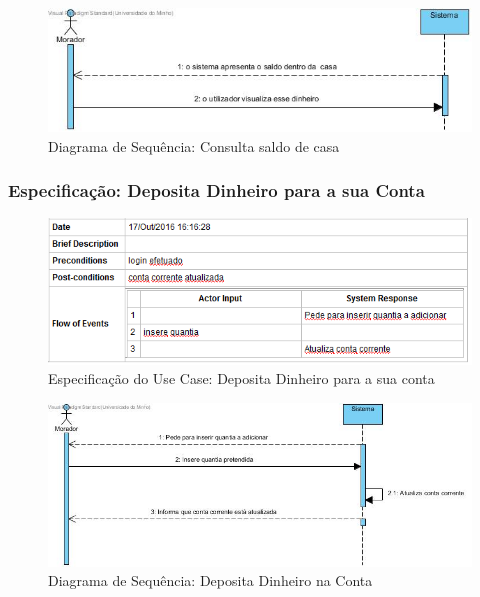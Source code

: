 \begin{figure}[htb!]
	\centering
	\includegraphics[scale=0.5]{imagens/diagramaSeq/ConsultaSaldodeCasa}  
	\caption{Diagrama de Sequência: Consulta saldo de casa  }  
\end{figure}


\newpage

\subsubsection{Especificação: Deposita Dinheiro para a sua Conta }
\begin{figure}[htb!]
	\centering
	\includegraphics[scale=0.6]{imagens/Especificacoes/depositadinheiro}  
	\caption{Especificação do Use Case: Deposita Dinheiro para a sua conta  }  
\end{figure}

\begin{figure}[htb!]
	\centering
	\includegraphics[scale=0.5]{imagens/diagramaSeq/DepositaDinheiroConta}  
	\caption{Diagrama de Sequência: Deposita Dinheiro na Conta}  
\end{figure}

